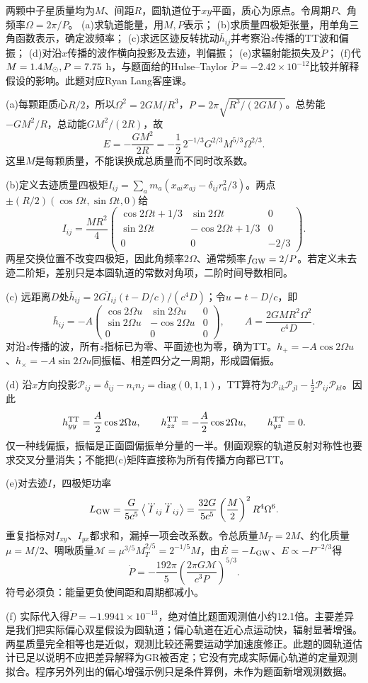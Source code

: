 \begin{exercise}
两颗中子星质量均为$M$、间距$R$，圆轨道位于$xy$平面，质心为原点。令周期$P$、角频率$\Omega=2\pi/P$。
(a)求轨道能量，用$M,P$表示；
(b)求质量四极矩张量，用单角三角函数表示，确定波频率；
(c)求远区迹反转扰动$\bar h_{ij}$并考察沿$z$传播的TT波和偏振；
(d)对沿$x$传播的波作横向投影及去迹，判偏振；
(e)求辐射能损失及$\dot P$；
(f)代$M=1.4M_{\odot},P=7.75$ h，与题面给的Hulse--Taylor $\dot P=-2.42\times10^{-12}$比较并解释假设的影响。此题对应Ryan Lang客座课。
\end{exercise}
\begin{solution}
(a)每颗距质心$R/2$，所以$\Omega^2=2GM/R^3$，$P=2\pi\sqrt{R^3/(2GM)}$。总势能$-GM^2/R$，总动能$GM^2/(2R)$，故
\[
 E=-\frac{GM^2}{2R}
 =-\frac12\,2^{-1/3}G^{2/3}M^{5/3}\Omega^{2/3}.
\]
这里$M$是每颗质量，不能误换成总质量而不同时改系数。

(b)定义去迹质量四极矩$I_{ij}=\sum_a m_a(x_{ai}x_{aj}-\delta_{ij}r_a^2/3)$。两点$\pm(R/2)(\cos\Omega t,\sin\Omega t,0)$给
\[
 I_{ij}=\frac{MR^2}{4}
 \begin{pmatrix}
 \cos2\Omega t+1/3&\sin2\Omega t&0\\
 \sin2\Omega t&-\cos2\Omega t+1/3&0\\
 0&0&-2/3
 \end{pmatrix}.
\]
两星交换位置不改变四极矩，因此角频率$2\Omega$、通常频率$f_{\rm GW}=2/P$。若定义未去迹二阶矩，差别只是本圆轨道的常数对角项，二阶时间导数相同。

(c) 远距离$D$处$\bar h_{ij}=2G\ddot I_{ij}(t-D/c)/(c^4D)$；令$u=t-D/c$，即
\[
 \bar h_{ij}=-A
 \begin{pmatrix}\cos2\Omega u&\sin2\Omega u&0\\
 \sin2\Omega u&-\cos2\Omega u&0\\0&0&0\end{pmatrix},
 \qquad A=\frac{2GMR^2\Omega^2}{c^4D}.
\]
对沿$z$传播的波，所有$z$指标已为零、平面迹也为零，确为TT。$h_+=-A\cos2\Omega u$、$h_\times=-A\sin2\Omega u$同振幅、相差四分之一周期，形成圆偏振。

(d) 沿$x$方向投影$\mathcal P_{ij}=\delta_{ij}-n_in_j=\mathrm{diag}(0,1,1)$，TT算符为$\mathcal P_{ik}\mathcal P_{jl}-\tfrac12\mathcal P_{ij}\mathcal P_{kl}$。因此
\[
 h_{yy}^{\rm TT}=\frac A2\cos2\Omega u,\qquad
 h_{zz}^{\rm TT}=-\frac A2\cos2\Omega u,\qquad
 h_{yz}^{\rm TT}=0.
\]
仅一种线偏振，振幅是正面圆偏振单分量的一半。侧面观察的轨道反射对称性也要求交叉分量消失；不能把(c)矩阵直接称为所有传播方向都已TT。

(e)对去迹$I$，四极矩功率
\[
 L_{\rm GW}=\frac{G}{5c^5}\left\langle\dddot I_{ij}\dddot I_{ij}\right\rangle
 =\frac{32G}{5c^5}\left(\frac M2\right)^2R^4\Omega^6.
\]
重复指标对$I_{xy}$、$I_{yx}$都求和，漏掉一项会改系数。令总质量$M_T=2M$、约化质量$\mu=M/2$、啁啾质量$\mathcal M=\mu^{3/5}M_T^{2/5}=2^{-1/5}M$，由$\dot E=-L_{\rm GW}$、$E\propto-P^{-2/3}$得
\[
 \dot P=-\frac{192\pi}{5}
 \left(\frac{2\pi G\mathcal M}{c^3P}\right)^{5/3}.
\]
符号必须负：能量更负使间距和周期都减小。

(f) 实际代入得$\dot P=-1.9941\times10^{-13}$，绝对值比题面观测值小约12.1倍。主要差异是我们把实际偏心双星假设为圆轨道；偏心轨道在近心点运动快，辐射显著增强。两星质量完全相等也是近似，观测比较还需要运动学加速度修正。此题的圆轨道估计已足以说明不应把差异解释为GR被否定；它没有完成实际偏心轨道的定量观测拟合。程序另外列出的偏心增强示例只是条件算例，未作为题面新增观测数据。
\end{solution}
